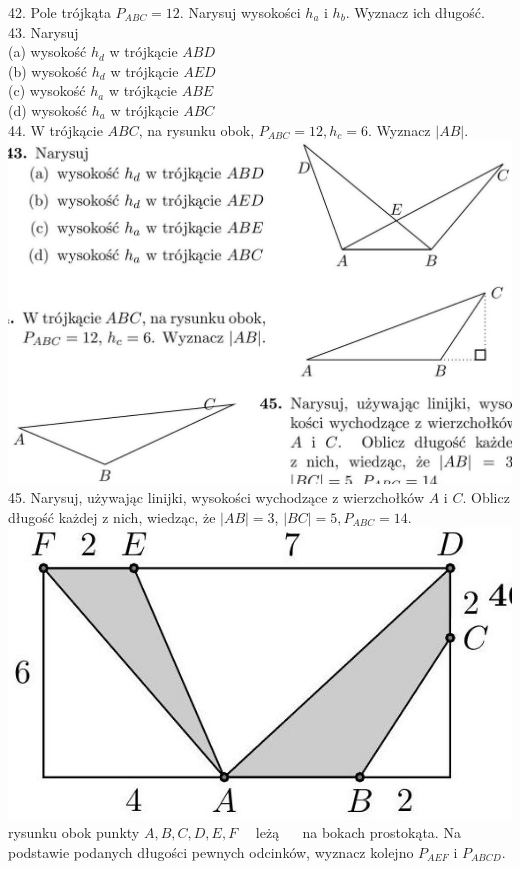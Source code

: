 \documentclass[10pt]{article}
\begin{document}
42. Pole trójkąta \(P_{A B C}=12\). Narysuj wysokości \(h_{a}\) i \(h_{b}\). Wyznacz ich długość.\\
43. Narysuj\\
(a) wysokość \(h_{d}\) w trójkącie \(A B D\)\\
(b) wysokość \(h_{d}\) w trójkącie \(A E D\)\\
(c) wysokość \(h_{a}\) w trójkącie \(A B E\)\\
(d) wysokość \(h_{a}\) w trójkącie \(A B C\)\\
44. W trójkącie \(A B C\), na rysunku obok, \(P_{A B C}=12, h_{c}=6\). Wyznacz \(|A B|\).\\
\includegraphics[max width=\textwidth, center]{2024_11_21_8f01584889ff06348ae7g-199(2)}\\
45. Narysuj, używając linijki, wysokości wychodzące z wierzchołków \(A\) i \(C\). Oblicz długość każdej z nich, wiedząc, że \(|A B|=3\), \(|B C|=5, P_{A B C}=14\).\\
\includegraphics[max width=\textwidth, center]{2024_11_21_8f01584889ff06348ae7g-199(1)}\\
rysunku obok punkty \(A, B, C, D, E, F \quad\) leżą \(\quad\) na bokach prostokąta. Na podstawie podanych długości pewnych odcinków, wyznacz kolejno \(P_{A E F}\) i \(P_{A B C D}\).
\end{document}

